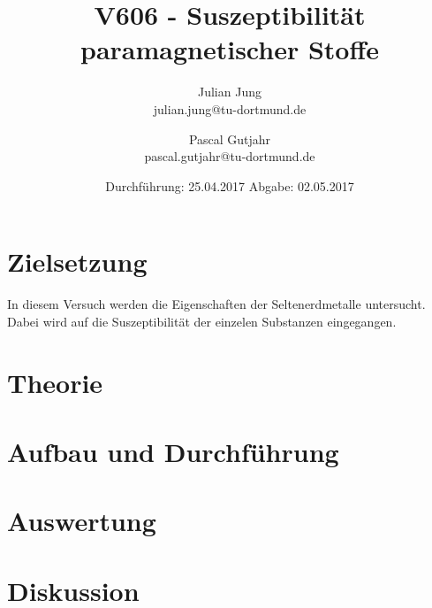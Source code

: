 

\title{V606 - Suszeptibilität paramagnetischer Stoffe}
\author{Julian Jung \\ julian.jung@tu-dortmund.de
  \and Pascal Gutjahr \\ pascal.gutjahr@tu-dortmund.de}
  \date{Durchführung: 25.04.2017
  \hspace{3em}
  Abgabe: 02.05.2017}
  
\maketitle
\newpage
\tableofcontents
\newpage
\section{Zielsetzung}
In diesem Versuch werden die Eigenschaften der Seltenerdmetalle untersucht.
Dabei wird auf die Suszeptibilität der einzelen Substanzen eingegangen.
\section{Theorie}

\section{Aufbau und Durchführung}
\section{Auswertung}
\section{Diskussion}
% 
\printbibliography

